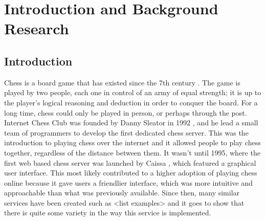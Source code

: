 \chapter{Introduction and Background Research}

\label{chapter1}



\section{Introduction}

Chess is a board game that has existed since the 7th century \cite{AHistoryOfChess}. The game is played by two people, each one in control of an army of equal strength; it is up to the player's logical reasoning and deduction in order to conquer the board. For a long time, chess could only be played in person, or perhaps through the post. Internet Chess Club was founded by Danny Sleator in 1992 \cite{InternetChessClub}, and he lead a small team of programmers to develop the first dedicated chess server. This was the introduction to playing chess over the internet and it allowed people to play chess together, regardless of the distance between them. It wasn't until 1995, where the first web based chess server was launched by Caissa \cite{Caissa}, which featured a graphical user interface. This most likely contributed to a higher adoption of playing chess online because it gave users a friendlier interface, which was more intuitive and approachable than what was previously available. Since then, many similar services have been created such as <list examples> and it goes to show that there is quite some variety in the way this service is implemented.

